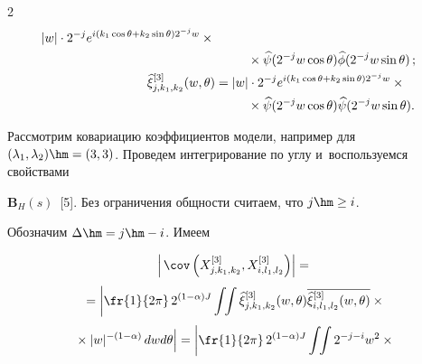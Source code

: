 \begin{multicols}{2}
\begin{align*}
|w|\cdot 2^{-j}e^{i(k_1\cos\theta+k_2\sin\theta) 2^{-j} w}{}\times{}\\


&\hspace*{9mm}{}\times \widehat{\psi}(2^{-j}w\cos\theta) \widehat{\phi}(2^{-j}w\sin\theta)\,;\\


\widehat{\xi}_{j,k_1,k_2}^{[3]}(w,\theta) &=


|w|\cdot 2^{-j}e^{i(k_1\cos\theta+k_2\sin\theta) 2^{-j} w} \times{}\\


&\hspace*{9mm}{}\times\widehat{\psi}(2^{-j}w\cos\theta) \widehat{\psi}(2^{-j}w\sin\theta).


\end{align*}


Рассмотрим ковариацию коэффициентов модели, например для $(\lambda_1 ,\lambda_2)


\hm=(3,3)$. Проведем интегрирование по углу и~воспользуемся свойствами


$\mathbf{B}_H(s)$~[5]. Без ограничения общности считаем, что  $j \hm\geq i$.


Обозначим $\Delta \hm= j \hm- i$. Имеем





\columnbreak





\noindent


\begin{multline*}


\left\vert \,\cov\left(X_{j,k_1,k_2}^{[3]},X_{i,l_1,l_2}^{[3]}\right)\right\vert


={}\\[3pt]


{}= \left\vert \fr{1}{2\pi}\,2^{(1-\alpha)J}\int \!\!\int


\widehat{\xi}_{j,k_1,k_2}^{[3]}(w,\theta) \overline{\widehat{\xi}_{i,l_1,l_2}^{[3]}


(w,\theta)} \times{}\right.\\[3pt]


\left.{}\times |w|^{-(1-\alpha)}\, dw d\theta \vphantom{\fr{1}{2\pi}}


\right\vert=


\left\vert \fr{1}{2\pi}\,2^{(1-\alpha)J}\int \!\!\int


 2^{-j-i} w^2\times{}\right.\\[3pt]



\end{multline*}
\end{multicols}
